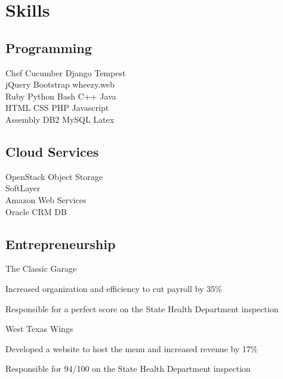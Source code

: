 \documentclass[letterpaper]{resume} %
\begin{document}
\begin{minipage}[t]{0.33\textwidth}
\section{Skills}

\subsection{Programming}

Chef \textbullet{} Cucumber \textbullet{} Django \textbullet{} Tempest\\
jQuery \textbullet{} Bootstrap \textbullet{} wheezy.web\\ 
Ruby \textbullet{} Python \textbullet{} Bash \textbullet{} C++ \textbullet{} Java\\
HTML \textbullet{} CSS \textbullet{} PHP \textbullet{} Javascript \\
Assembly \textbullet{} DB2 \textbullet{} MySQL \textbullet{} Latex

\sectionspace %

\subsection{Cloud Services}
OpenStack Object Storage \\
SoftLayer \\
Amazon Web Services \\
Oracle CRM DB \\

\sectionspace 

\subsection{Entrepreneurship}The Classic Garage
\vspace{\topsep} %
\begin{tightitemize}
\item Increased organization and efficiency to cut payroll by 35\%
\item Responsible for a perfect score on the State Health Department inspection
\end{tightitemize}
West Texas Wings 
\begin{tightitemize}
\item Developed a website to host the menu and increased revenue by 17\%
\item Responsible for 94/100 on the State Health Department inspection
\end{tightitemize}


\end{minipage} %
\end{document}
